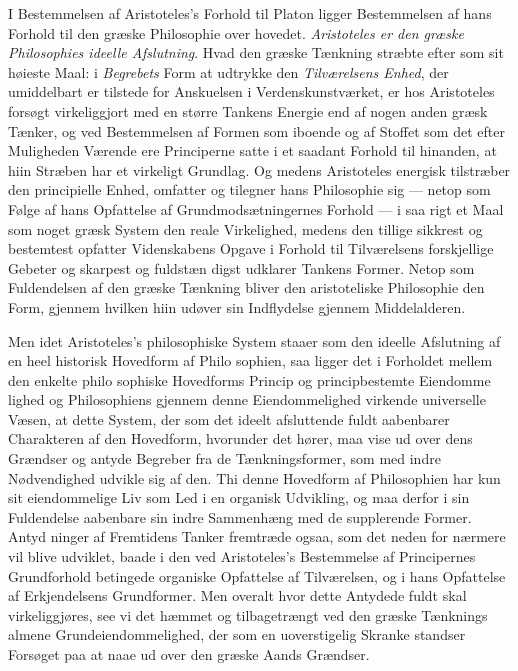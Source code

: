 \documentclass[12pt,a4paper]{book}
\begin{document}
I Bestemmelsen af Aristoteles's Forhold til Platon ligger
Bestemmelsen af hans Forhold til den græske Philosophie over\-%
hovedet. \emph{Aristoteles er den græske Philosophies
ideelle Afslutning}. Hvad den græske Tænkning stræbte
efter som sit høieste Maal: i \emph{Begrebets} Form at udtrykke
den \emph{Tilværelsens Enhed}, der umiddelbart er tilstede for
Anskuelsen i Verdenskunstværket, er hos Aristoteles forsøgt
virkeliggjort med en større Tankens Energie end af nogen
anden græsk Tænker, og ved Bestemmelsen af Formen som
iboende og af Stoffet som det efter Muligheden Værende ere
Principerne satte i et saadant Forhold til hinanden, at hiin
Stræben har et virkeligt Grundlag. Og medens Aristoteles
energisk tilstræber den principielle Enhed, omfatter og tilegner
hans Philosophie sig --- netop som Følge af hans Opfattelse
af Grundmodsætningernes Forhold --- i saa rigt et Maal som
noget græsk System den reale Virkelighed, medens den tillige
sikkrest og bestemtest opfatter Videnskabens Opgave i Forhold
til Tilværelsens forskjellige Gebeter og skarpest og fuldstæn\-%
digst udklarer Tankens Former. Netop som Fuldendelsen af
den græske Tænkning bliver den aristoteliske Philosophie den
Form, gjennem hvilken hiin udøver sin Indflydelse gjennem
Middelalderen.

Men idet Aristoteles's philosophiske System staaer som
den ideelle Afslutning af en heel historisk Hovedform af Philo\-%
sophien, saa ligger det i Forholdet mellem den enkelte philo\-%
sophiske Hovedforms Princip og principbestemte Eiendomme\-%
lighed og Philosophiens gjennem denne Eiendommelighed
virkende universelle Væsen, at dette System, der som det ideelt
afsluttende fuldt aabenbarer Charakteren af den Hovedform,
hvorunder det hører, maa vise ud over dens Grændser og
antyde Begreber fra de Tænkningsformer, som med indre
Nødvendighed udvikle sig af den. Thi denne Hovedform af
Philosophien har kun sit eiendommelige Liv som Led i en
organisk Udvikling, og maa derfor i sin Fuldendelse aabenbare
sin indre Sammenhæng med de supplerende Former. Antyd\-%
ninger af Fremtidens Tanker fremtræde ogsaa, som det neden\-%
for nærmere vil blive udviklet, baade i den ved Aristoteles's
Bestemmelse af Principernes Grundforhold betingede organiske
Opfattelse af Tilværelsen, og i hans Opfattelse af Erkjendelsens
Grundformer. Men overalt hvor dette Antydede fuldt skal
virkeliggjøres, see vi det hæmmet og tilbagetrængt ved den
græske Tænknings almene Grundeiendommelighed, der som en
uoverstigelig Skranke standser Forsøget paa at naae ud over
den græske Aands Grændser.
\end{document}
